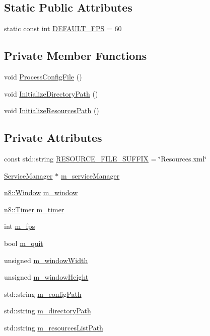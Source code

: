 \subsection*{Static Public Attributes}
\begin{DoxyCompactItemize}
\item 
static const int \hyperlink{classn8_1_1_game_ad5b5e680104848b530623a0ff2984dd9}{D\-E\-F\-A\-U\-L\-T\-\_\-\-F\-P\-S} = 60
\end{DoxyCompactItemize}
\subsection*{Private Member Functions}
\begin{DoxyCompactItemize}
\item 
void \hyperlink{classn8_1_1_game_a3086b13e04d6926b60c25250702e0f76}{Process\-Config\-File} ()
\item 
void \hyperlink{classn8_1_1_game_a177132db60f27b7b72cedebe8b3c31ff}{Initialize\-Directory\-Path} ()
\item 
void \hyperlink{classn8_1_1_game_a406cab23a3df73bb69e29b6e6f0de5a4}{Initialize\-Resources\-Path} ()
\end{DoxyCompactItemize}
\subsection*{Private Attributes}
\begin{DoxyCompactItemize}
\item 
const std\-::string \hyperlink{classn8_1_1_game_a4ba4f2b01a5cc821bdfeb371141eb7c5}{R\-E\-S\-O\-U\-R\-C\-E\-\_\-\-F\-I\-L\-E\-\_\-\-S\-U\-F\-F\-I\-X} = \char`\"{}Resources.\-xml\char`\"{}
\item 
\hyperlink{classn8_1_1_service_manager}{Service\-Manager} $\ast$ \hyperlink{classn8_1_1_game_a30bd8276bfbc388dbade2b4c267b8475}{m\-\_\-service\-Manager}
\item 
\hyperlink{classn8_1_1_window}{n8\-::\-Window} \hyperlink{classn8_1_1_game_a091449bc88fce9f180acbcca101ebdbe}{m\-\_\-window}
\item 
\hyperlink{classn8_1_1_timer}{n8\-::\-Timer} \hyperlink{classn8_1_1_game_a0eab78b9c0f627925ffb1124d6272dff}{m\-\_\-timer}
\item 
int \hyperlink{classn8_1_1_game_a6a379dae9cb3bc1f8b423373600dd037}{m\-\_\-fps}
\item 
bool \hyperlink{classn8_1_1_game_a75f5cfb356d519dcdf9b5ef7db25006f}{m\-\_\-quit}
\item 
unsigned \hyperlink{classn8_1_1_game_ae1e6c5b939a154d09ed65496156090ec}{m\-\_\-window\-Width}
\item 
unsigned \hyperlink{classn8_1_1_game_af3e88c8758f2e09303408637cbbf656f}{m\-\_\-window\-Height}
\item 
std\-::string \hyperlink{classn8_1_1_game_a3e6ebc71d694ec81fd28e99ccc44794a}{m\-\_\-config\-Path}
\item 
std\-::string \hyperlink{classn8_1_1_game_a8c04b39e97c22b6fdf8fb1861f09c556}{m\-\_\-directory\-Path}
\item 
std\-::string \hyperlink{classn8_1_1_game_a19483f2905db0ae25cfd3b7c9efd69ef}{m\-\_\-resources\-List\-Path}
\end{DoxyCompactItemize}


